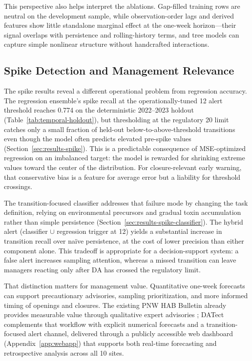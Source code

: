 \documentclass[toxins,article,submit,moreauthors]{Definitions/mdpi}
\begin{document}
This perspective also helps interpret the ablations. Gap-filled training rows are neutral on the development sample, while observation-order lags and derived features show little standalone marginal effect at the one-week horizon---their signal overlaps with persistence and rolling-history terms, and tree models can capture simple nonlinear structure without handcrafted interactions.

\subsection{Spike Detection and Management Relevance}
\label{sec:discussion-spike}

The spike results reveal a different operational problem from regression accuracy. The regression ensemble's spike recall at the operationally-tuned \SI{12}{\microgrampeg} alert threshold reaches 0.774 on the deterministic 2022--2023 holdout (Table~\ref{tab:temporal-holdout}), but thresholding at the regulatory \SI{20}{\microgrampeg} limit catches only a small fraction of held-out below-to-above-threshold transitions even though the model often predicts elevated pre-spike values (Section~\ref{sec:results-spike}). This is a predictable consequence of MSE-optimized regression on an imbalanced target: the model is rewarded for shrinking extreme values toward the center of the distribution. For closure-relevant early warning, that conservative bias is a feature for average error but a liability for threshold crossings.

The transition-focused classifier addresses that failure mode by changing the task definition, relying on environmental precursors and gradual toxin accumulation rather than simple persistence (Section~\ref{sec:results-spike-classifier}). The hybrid alert (classifier $\cup$ regression trigger at \SI{12}{\microgrampeg}) yields a substantial increase in transition recall over na\"ive persistence, at the cost of lower precision than either component alone. This tradeoff is appropriate for a decision-support system: a false alert increases sampling attention, whereas a missed transition can leave managers reacting only after DA has crossed the regulatory limit.

That distinction matters for management value. Quantitative one-week forecasts can support precautionary advisories, sampling prioritization, and more informed timing of openings and closures. The existing PNW HAB Bulletin already provides measurable value through qualitative expert advisories \cite{Jin2024}; DATect complements that workflow with explicit numerical forecasts and a transition-focused alert channel, delivered through a publicly accessible web dashboard (Appendix~\ref{app:webapp}) that supports both real-time forecasting and retrospective analysis across all 10 sites.
\end{document}

